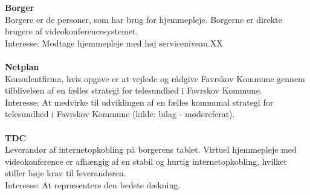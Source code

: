 \documentclass[10pt,a4paper]{article}
\begin{document}
\textbf{Borger}\\
Borgere er de personer, som har brug for hjemmepleje. Borgerne er direkte brugere af videokonferencesystemet.\\
Interesse: Modtage hjemmepleje med høj serviceniveau.XX\\ \\
\textbf{Netplan}\\
Konsulentfirma\cite{netplan}, hvis opgave er at vejlede og rådgive Favrskov Kommune gennem tilblivelsen af en fælles strategi for telesundhed i Favrskov Kommune.\\
Interesse: At medvirke til udviklingen af en fælles kommunal strategi for telesundhed i Favrskov Kommune (kilde: bilag - mødereferat).\\ \\
\textbf{TDC}\\
Leverandør af internetopkobling på borgerens tablet. Virtuel hjemmepleje med videokonference er afhængig af en stabil og hurtig internetopkobling, hvilket stiller høje krav til leverandøren. \\
Interesse: At repræsentere den bedste dækning.
\end{document}
